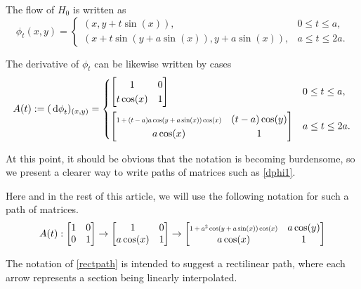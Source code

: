 The flow of $H_0$ is written as
\begin{equation}
\phi_t(x,y) = \begin{cases}
(x,y+t \sin(x)), & 0 \leq t \leq a,\\
(x+t \sin(y+a \sin(x)), y + a \sin(x)), & a \leq t \leq 2a.
\end{cases}
\end{equation}

The derivative of $\phi_t$ can be likewise written by cases
\begin{equation}\label{dphi1}
A(t) := (\dl \phi_t)_{(x,y)} = \begin{cases}
\begin{bmatrix}
1 & 0\\
t \cos(x) & 1
\end{bmatrix} & 0 \leq t \leq a,\\[1.3em]
\begin{bmatrix}
\scalebox{0.7}{$1+(t-a) a \cos(y+a \sin(x)) \cos(x)$} &  (t-a) \cos(y)\\
a \cos(x) & 1
\end{bmatrix}
 & a \leq t \leq 2a.
\end{cases}
\end{equation}

At this point, it should be obvious that the notation is becoming burdensome, so we present a clearer way to write paths of matrices such as \eqref{dphi1}.

Here and in the rest of this article, we will use the following notation for such a path of matrices.
\begin{equation}\label{rectpath}
A(t) :
\begin{bmatrix}
1 & 0\\
0 & 1
\end{bmatrix}
\to
\begin{bmatrix}
1 & 0\\
a \cos(x) & 1
\end{bmatrix}
\to
\begin{bmatrix}
\scalebox{0.7}{$1+ a^2 \cos(y+a \sin(x)) \cos(x)$} &  a \cos(y)\\
a \cos(x) & 1
\end{bmatrix}
\end{equation}

The notation of \eqref{rectpath} is intended to suggest a rectilinear path, where each arrow represents a section being linearly interpolated.

